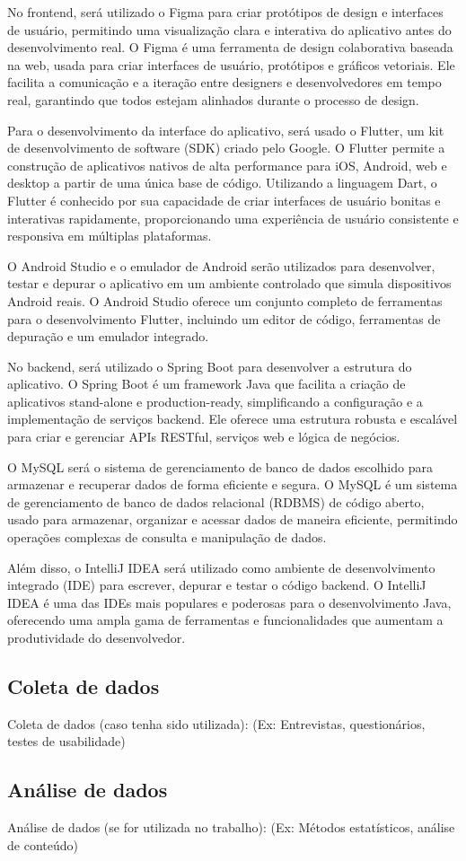 No frontend, será utilizado o Figma para criar protótipos de design e interfaces de usuário, permitindo uma visualização clara e interativa do aplicativo antes do desenvolvimento real. O Figma é uma ferramenta de design colaborativa baseada na web, usada para criar interfaces de usuário, protótipos e gráficos vetoriais. Ele facilita a comunicação e a iteração entre designers e desenvolvedores em tempo real, garantindo que todos estejam alinhados durante o processo de design.

Para o desenvolvimento da interface do aplicativo, será usado o Flutter, um kit de desenvolvimento de software (SDK) criado pelo Google. O Flutter permite a construção de aplicativos nativos de alta performance para iOS, Android, web e desktop a partir de uma única base de código. Utilizando a linguagem Dart, o Flutter é conhecido por sua capacidade de criar interfaces de usuário bonitas e interativas rapidamente, proporcionando uma experiência de usuário consistente e responsiva em múltiplas plataformas.

O Android Studio e o emulador de Android serão utilizados para desenvolver, testar e depurar o aplicativo em um ambiente controlado que simula dispositivos Android reais. O Android Studio oferece um conjunto completo de ferramentas para o desenvolvimento Flutter, incluindo um editor de código, ferramentas de depuração e um emulador integrado.

No backend, será utilizado o Spring Boot para desenvolver a estrutura do aplicativo. O Spring Boot é um framework Java que facilita a criação de aplicativos stand-alone e production-ready, simplificando a configuração e a implementação de serviços backend. Ele oferece uma estrutura robusta e escalável para criar e gerenciar APIs RESTful, serviços web e lógica de negócios.

O MySQL será o sistema de gerenciamento de banco de dados escolhido para armazenar e recuperar dados de forma eficiente e segura. O MySQL é um sistema de gerenciamento de banco de dados relacional (RDBMS) de código aberto, usado para armazenar, organizar e acessar dados de maneira eficiente, permitindo operações complexas de consulta e manipulação de dados.

Além disso, o IntelliJ IDEA será utilizado como ambiente de desenvolvimento integrado (IDE) para escrever, depurar e testar o código backend. O IntelliJ IDEA é uma das IDEs mais populares e poderosas para o desenvolvimento Java, oferecendo uma ampla gama de ferramentas e funcionalidades que aumentam a produtividade do desenvolvedor.

\subsection{Coleta de dados}

Coleta de dados (caso tenha sido utilizada): (Ex: Entrevistas, questionários, testes de usabilidade)

\subsection{Análise de dados}

Análise de dados (se for utilizada no trabalho): (Ex: Métodos estatísticos, análise de conteúdo)
